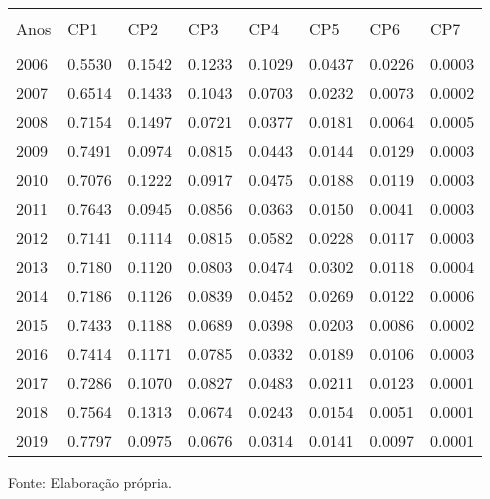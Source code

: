 \footnotesize
\vspace{0.05cm}
\label{moran_table}
\begin{tabularx}{\textwidth}{lXXXXXXX}
    \hline \\[-1.9ex]	 
    Anos & CP1 & CP2 & CP3 & CP4 & CP5 & CP6 & CP7 \\
    \hline \\[-1.9ex]	 
    2006 &  0.5530 &  0.1542 &  0.1233 &  0.1029 &  0.0437 &  0.0226 &  0.0003 \\
    2007 &  0.6514 &  0.1433 &  0.1043 &  0.0703 &  0.0232 &  0.0073 &  0.0002 \\
    2008 &  0.7154 &  0.1497 &  0.0721 &  0.0377 &  0.0181 &  0.0064 &  0.0005 \\
    2009 &  0.7491 &  0.0974 &  0.0815 &  0.0443 &  0.0144 &  0.0129 &  0.0003 \\
    2010 &  0.7076 &  0.1222 &  0.0917 &  0.0475 &  0.0188 &  0.0119 &  0.0003 \\
    2011 &  0.7643 &  0.0945 &  0.0856 &  0.0363 &  0.0150 &  0.0041 &  0.0003 \\
    2012 &  0.7141 &  0.1114 &  0.0815 &  0.0582 &  0.0228 &  0.0117 &  0.0003 \\
    2013 &  0.7180 &  0.1120 &  0.0803 &  0.0474 &  0.0302 &  0.0118 &  0.0004 \\
    2014 &  0.7186 &  0.1126 &  0.0839 &  0.0452 &  0.0269 &  0.0122 &  0.0006 \\
    2015 &  0.7433 &  0.1188 &  0.0689 &  0.0398 &  0.0203 &  0.0086 &  0.0002 \\
    2016 &  0.7414 &  0.1171 &  0.0785 &  0.0332 &  0.0189 &  0.0106 &  0.0003 \\
    2017 &  0.7286 &  0.1070 &  0.0827 &  0.0483 &  0.0211 &  0.0123 &  0.0001 \\
    2018 &  0.7564 &  0.1313 &  0.0674 &  0.0243 &  0.0154 &  0.0051 &  0.0001 \\
    2019 &  0.7797 &  0.0975 &  0.0676 &  0.0314 &  0.0141 &  0.0097 &  0.0001 \\
	\hline 
\end{tabularx}
\footnotesize{Fonte: Elaboração própria.  }\\
